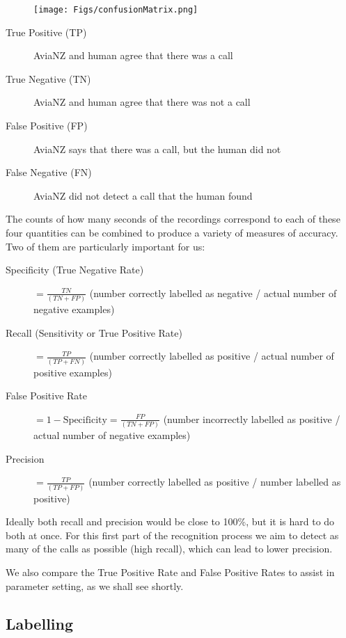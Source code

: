 \documentclass{article}
\begin{document}
\begin{figure}[h!]
\centering
\texttt{[image: Figs/confusionMatrix.png]}
\end{figure}

\begin{description}
\item[True Positive (TP)] AviaNZ and human agree that there was a call 
\item[True Negative (TN)] AviaNZ and human agree that there was not a call
\item[False Positive (FP)] AviaNZ says that there was a call, but the human did not
\item[False Negative (FN)] AviaNZ did not detect a call that the human found
\end{description}

The counts of how many seconds of the recordings correspond to each of these four quantities can be combined to produce a variety of measures of accuracy. Two of them are particularly important for us:

\begin{description}
\item[Specificity (True Negative Rate)] $= \frac{TN}{(TN + FP)}$ (number correctly labelled as negative / actual number of negative examples)
\item[Recall (Sensitivity or True Positive Rate)] $= \frac{TP}{(TP + FN)}$ (number correctly labelled as positive / actual number of positive examples) 
\item[False Positive Rate] $= 1 - \mathrm{Specificity} = \frac{FP}{(TN + FP)}$ (number incorrectly labelled as positive / actual number of negative examples)
\item[Precision] $= \frac{TP}{(TP + FP)}$ (number correctly labelled as positive / number labelled as positive)
\end{description}

Ideally both recall and precision would be close to 100\%, but it is hard to do both at once. For this first part of the recognition process we aim to detect as many of the calls as possible (high recall), which can lead to lower precision. 

We also compare the True Positive Rate and False Positive Rates to assist in parameter setting, as we shall see shortly.

\subsection{Labelling}
\end{document}
